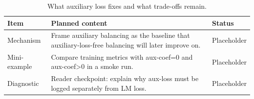 \begin{table}[H]
\centering
\caption{What auxiliary loss fixes and what trade-offs remain.}
\label{tab:ch07-chapter-summary-and-handoff}
\begin{tabularx}{\textwidth}{p{}X p{}}
\toprule
Item & Planned content & Status \\
\midrule
Mechanism & Frame auxiliary balancing as the baseline that auxiliary-loss-free balancing will later improve on. & Placeholder \\
Mini-example & Compare training metrics with aux-coef=0 and aux-coef>0 in a smoke run. & Placeholder \\
Diagnostic & Reader checkpoint: explain why aux-loss must be logged separately from LM loss. & Placeholder \\
\bottomrule
\end{tabularx}
\end{table}
